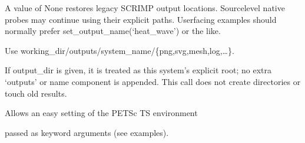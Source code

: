 \documentclass[letterpaper,10pt,english]{sphinxmanual}
\begin{document}
\begin{fulllineitems}
\begin{fulllineitems}
\sphinxAtStartPar
A value of None restores legacy SCRIMP output locations.
Source\sphinxhyphen{}level native probes may continue using their explicit
paths. User\sphinxhyphen{}facing examples should normally prefer
set\_output\_name(‘heat\_wave’) or the like.

\end{fulllineitems}


\begin{fulllineitems}
\label{\detokenize{scrimp:scrimp.dphs.DPHS.set_output_name}}
\pysigstartsignatures
\pysiglinewithargsret
{}
{\sphinxparamcomma {}\sphinxparamcomma {}\sphinxparamcomma {}}
{}
\pysigstopsignatures
\sphinxAtStartPar
Use working\_dir/outputs/system\_name/\{png,svg,mesh,log,…\}.

\sphinxAtStartPar
If output\_dir is given, it is treated as this system’s explicit
root; no extra ‘outputs’ or name component is appended.
This call does not create directories or touch old results.

\end{fulllineitems}


\begin{fulllineitems}
\label{\detokenize{scrimp:scrimp.dphs.DPHS.set_time_scheme}}
\pysigstartsignatures
\pysiglinewithargsret
{}
{}
{}
\pysigstopsignatures
\sphinxAtStartPar
Allows an easy setting of the PETSc TS environment
\begin{description}
\begin{description}
\sphinxAtStartPar
passed as keyword arguments (see examples).

\end{description}

\end{description}


\end{fulllineitems}
\end{fulllineitems}
\end{document}
